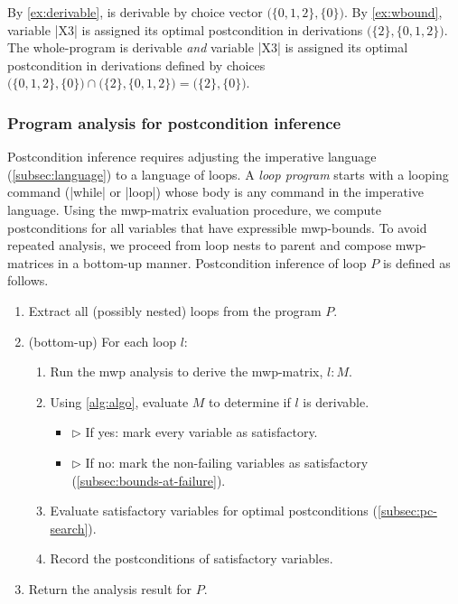 \begin{example}\label{ex:opt-derivation}
By \autoref{ex:derivable}, \exname is derivable by choice vector \(\big(\{0, 1, 2\}, \{0\}\big)\).
By \autoref{ex:wbound}, variable \pr|X3| is assigned its optimal postcondition in derivations \(\big(\{2\}, \{0,1,2\}\big)\).
The whole-program is derivable \emph{and} variable \pr|X3| is assigned its optimal postcondition in derivations defined by choices
\( \big(\{0, 1, 2\}, \{0\}\big) \cap \big(\{2\}, \{0,1,2\}\big) = \big( \{2\}, \{0\}\big) \).
\end{example}

\subsubsection{Program analysis for postcondition inference}
\label{subsec:inference}

Postcondition inference requires adjusting the imperative language (\autoref{subsec:language}) to a language of loops.
A \emph{loop program} starts with a looping command (\pr|while| or \pr|loop|) whose body is any command in the imperative language.
Using the mwp-matrix evaluation procedure, we compute postconditions for all variables that have expressible mwp-bounds.
To avoid repeated analysis, we proceed from loop nests to parent and compose mwp-matrices in a bottom-up manner. %
Postcondition inference of loop \(P\) is defined as follows.

\begin{enumerate}
    \item Extract all (possibly nested) loops from the program \(P\).
    \item (bottom-up) For each loop \(l\):
    \begin{enumerate}[label=(\roman*)]
    \item Run the mwp analysis to derive the mwp-matrix, \(l : M\).
    \item Using \autoref{alg:algo}, evaluate \(M\) to determine if \(l\) is derivable.
    \begin{itemize}
        \item[] \(\triangleright\) If yes: mark every variable as satisfactory.
        \item[] \(\triangleright\) If no: mark the non-failing variables as satisfactory (\autoref{subsec:bounds-at-failure}).
    \end{itemize}
    \item Evaluate satisfactory variables for optimal postconditions (\autoref{subsec:pc-search}).
    \item Record the postconditions of satisfactory variables.
    \end{enumerate}
    \item Return the analysis result for \(P\).
\end{enumerate}

